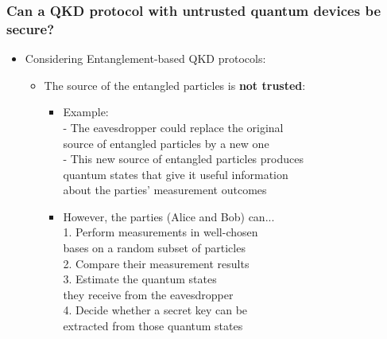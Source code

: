 \documentclass{beamer}
\begin{document}
		\begin{frame}
			\frametitle{\normalsize Can a QKD protocol with untrusted quantum devices be secure?}

            \vspace{2.5ex}
            \begin{itemize}
                \item Considering Entanglement-based QKD protocols:
                \begin{itemize}\small
                    \item The source of the entangled particles is \textbf{not trusted}:
                    \begin{itemize}
                        \item Example:\\
                         - The eavesdropper could replace the original\\\hspace{0.8ex} source of entangled particles by a new one\\
                         - This new source of entangled particles produces\\\hspace{0.8ex} quantum states that give it useful information \\\hspace{0.8ex} about the parties’ measurement outcomes
                        \item However, the parties (Alice and Bob) can...\\
                         1. Perform measurements in well-chosen\\\hspace{1.6ex} bases on a random subset of particles\\
                         2. Compare their measurement results\\
                         3. Estimate the quantum states\\\hspace{1.6ex} they receive from the eavesdropper\\
                         4. Decide whether a secret key can be\\\hspace{1.6ex} extracted from those quantum states
                    \end{itemize}
                \end{itemize}
            \end{itemize}
		\end{frame}
\end{document}
